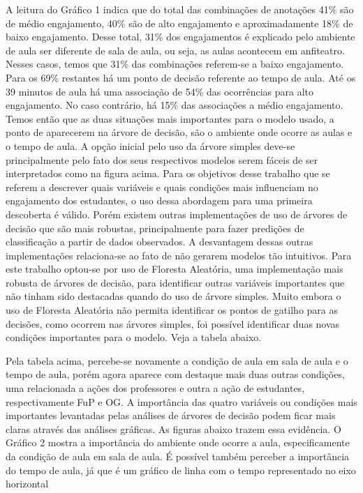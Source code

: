 A leitura do Gráfico 1 indica que do total das combinações de anotações 41\% são de médio engajamento, 40\% são de alto engajamento e aproximadamente 18\% de baixo engajamento.
Desse total, 31\% dos engajamentos é explicado pelo ambiente de aula ser diferente de sala de aula, ou seja, as aulas acontecem em anfiteatro. Nesses casos, temos que 31\% das combinações referem-se a baixo engajamento.
Para os 69\% restantes há um ponto de decisão referente ao tempo de aula. Até os 39 minutos de aula há uma associação de 54\% das ocorrências para alto engajamento. No caso contrário, há 15\% das associações a médio engajamento.
Temos então que as duas situações mais importantes para o modelo usado, a ponto de aparecerem na árvore de decisão, são o ambiente onde ocorre as aulas e o tempo de aula.
A opção inicial pelo uso da árvore simples deve-se principalmente pelo fato dos seus respectivos modelos serem fáceis de ser interpretados como na figura acima. Para os objetivos desse trabalho que se referem a descrever quais variáveis e quais condições mais influenciam no engajamento dos estudantes, o uso dessa abordagem para uma primeira descoberta é válido. Porém existem outras implementações de uso de árvores de decisão que são mais robustas, principalmente para fazer predições de classificação a partir de dados observados. A desvantagem dessas outras implementações relaciona-se ao fato de não gerarem modelos tão intuitivos. Para este trabalho optou-se por uso de Floresta Aleatória, uma implementação mais robusta de árvores de decisão, para identificar outras variáveis importantes que não tinham sido destacadas quando do uso de árvore simples.
Muito embora o uso de Floresta Aleatória não permita identificar os pontos de gatilho para as decisões, como ocorrem nas árvores simples, foi possível identificar duas novas condições importantes para o modelo. Veja a tabela abaixo.



Pela tabela acima, percebe-se novamente a condição de aula em sala de aula e o tempo de aula, porém agora aparece com destaque mais duas outras condições, uma relacionada a ações dos professores e outra a ação de estudantes, respectivamente FuP e OG.
A importância das quatro variáveis ou condições mais importantes levantadas pelas análises de árvores de decisão podem ficar mais claras através das análises gráficas. As figuras abaixo trazem essa evidência.
O Gráfico 2 mostra a importância do ambiente onde ocorre a aula, especificamente da condição de aula em sala de aula. É possível também perceber a importância do tempo de aula, já que é um gráfico de linha com o tempo representado no eixo horizontal


